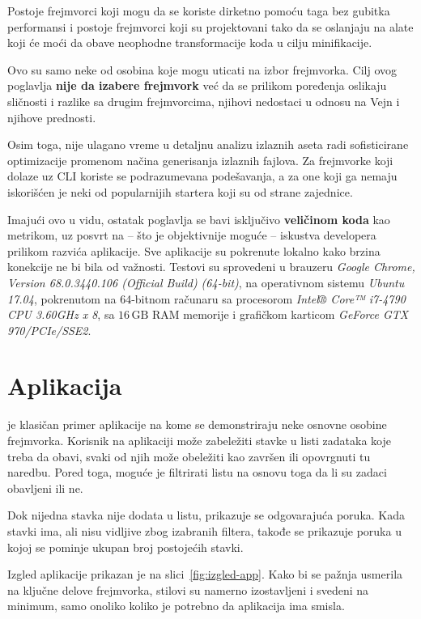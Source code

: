 Postoje frejmvorci koji mogu da se koriste dirketno pomoću  taga bez gubitka performansi i postoje frejmvorci koji su projektovani tako da se oslanjaju na alate koji će moći da obave neophodne transformacije koda u cilju minifikacije.

Ovo su samo neke od osobina koje mogu uticati na izbor frejmvorka.
Cilj ovog poglavlja \textbf{nije da izabere  frejmvork} već da se prilikom poređenja oslikaju sličnosti i razlike sa drugim frejmvorcima, njihovi nedostaci u odnosu na Vejn i njihove prednosti.

Osim toga, nije ulagano vreme u detaljnu analizu izlaznih aseta radi sofisticirane optimizacije promenom načina generisanja izlaznih fajlova.
Za frejmvorke koji dolaze uz CLI koriste se podrazumevana podešavanja, a za one koji ga nemaju iskorišćen je neki od popularnijih startera koji su  od strane zajednice.

Imajući ovo u vidu, ostatak poglavlja se bavi isključivo \textbf{veličinom koda} kao metrikom, uz posvrt na -- što je objektivnije moguće -- iskustva developera prilikom razvića aplikacije.
Sve aplikacije su pokrenute lokalno kako brzina konekcije ne bi bila od važnosti.
Testovi su sprovedeni u brauzeru \textsl{Google Chrome, Version 68.0.3440.106 (Official Build) (64-bit)}, na operativnom sistemu \textsl{Ubuntu 17.04}, pokrenutom na 64-bitnom računaru sa procesorom \textsl{Intel® Core™ i7-4790 CPU \@ 3.60GHz x 8}, sa $16\,\mathrm{GB}$ RAM memorije i grafičkom karticom \textsl{GeForce GTX 970/PCIe/SSE2}.

\section{Aplikacija}
\label{subsec:app}

 je klasičan primer aplikacije na kome se demonstriraju neke osnovne osobine frejmvorka.
Korisnik na aplikaciji može zabeležiti stavke u listi zadataka koje treba da obavi, svaki od njih može obeležiti kao završen ili opovrgnuti tu naredbu.
Pored toga, moguće je filtrirati listu na osnovu toga da li su zadaci obavljeni ili ne.

Dok nijedna stavka nije dodata u listu, prikazuje se odgovarajuća poruka.
Kada stavki ima, ali nisu vidljive zbog izabranih filtera, takođe se prikazuje poruka u kojoj se pominje ukupan broj postojećih stavki.

Izgled aplikacije prikazan je na slici~\ref{fig:izgled-app}. Kako bi se pažnja usmerila na ključne delove frejmvorka, stilovi su namerno izostavljeni i svedeni na minimum, samo onoliko koliko je potrebno da aplikacija ima smisla.

